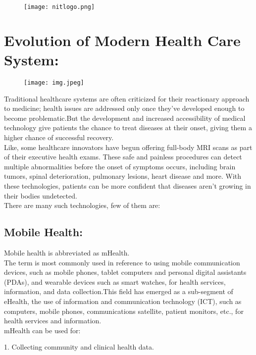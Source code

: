 \documentclass[a4paper,12pt]{article}
\author{Aashutosh Patel \\ Roll no- 21111001}
\begin{document}
\begin{figure}
	\centering
	\texttt{[image: nitlogo.png]}
\end{figure}
\maketitle
\clearpage
\large
\section{Evolution of Modern Health Care System:} 	      \begin{figure}[h]       
        	\texttt{[image: img.jpeg]}
\end{figure} 


Traditional healthcare systems are often criticized for their reactionary approach to medicine; health issues are addressed only once they’ve developed enough to become problematic.But the development and increased accessibility of medical technology give patients the chance to treat diseases at their onset, giving them a higher chance of successful recovery. 
\\
Like, some healthcare innovators have begun offering full-body MRI scans as part of their executive health exams. These safe and painless procedures can detect multiple abnormalities before the onset of symptoms occurs, including brain tumors, spinal deterioration, pulmonary lesions, heart disease and more. With these technologies, patients can be more confident that diseases aren’t growing in their bodies undetected.
\\
There are many such technologies, few of them are:
\clearpage
\subsection{Mobile Health:}
Mobile health is abbreviated as mHealth.
\\
The term is most
commonly used in reference to using mobile communication devices, such
as mobile phones, tablet computers and personal digital assistants (PDAs),
and wearable devices such as smart watches, for health services, information, and data collection.This field has emerged as a sub-segment
of eHealth, the use of information and communication technology (ICT),
such as computers, mobile phones, communications satellite, patient monitors, etc., for health services and information.
\\
mHealth can be used for:

1. Collecting community and clinical health data.
\end{document}
